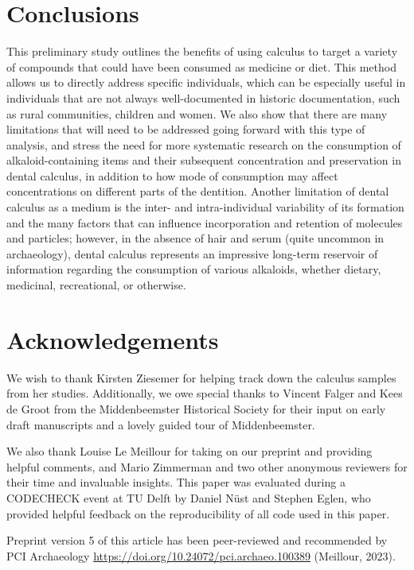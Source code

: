 \documentclass[
]{article}
\begin{document}
\section{Conclusions}\label{conclusions}

This preliminary study outlines the benefits of using calculus to target
a variety of compounds that could have been consumed as medicine or
diet. This method allows us to directly address specific individuals,
which can be especially useful in individuals that are not always
well-documented in historic documentation, such as rural communities,
children and women. We also show that there are many limitations that
will need to be addressed going forward with this type of analysis, and
stress the need for more systematic research on the consumption of
alkaloid-containing items and their subsequent concentration and
preservation in dental calculus, in addition to how mode of consumption
may affect concentrations on different parts of the dentition. Another
limitation of dental calculus as a medium is the inter- and
intra-individual variability of its formation and the many factors that
can influence incorporation and retention of molecules and particles;
however, in the absence of hair and serum (quite uncommon in
archaeology), dental calculus represents an impressive long-term
reservoir of information regarding the consumption of various alkaloids,
whether dietary, medicinal, recreational, or otherwise.

\section*{Acknowledgements}\label{acknowledgements}

We wish to thank Kirsten Ziesemer for helping track down the calculus
samples from her studies. Additionally, we owe special thanks to Vincent
Falger and Kees de Groot from the Middenbeemster Historical Society for
their input on early draft manuscripts and a lovely guided tour of
Middenbeemster.

We also thank Louise Le Meillour for taking on our preprint and
providing helpful comments, and Mario Zimmerman and two other anonymous
reviewers for their time and invaluable insights. This paper was
evaluated during a CODECHECK event at TU Delft by Daniel Nüst and
Stephen Eglen, who provided helpful feedback on the reproducibility of
all code used in this paper.

Preprint version 5 of this article has been peer-reviewed and
recommended by PCI Archaeology
\url{https://doi.org/10.24072/pci.archaeo.100389} (Meillour, 2023).
\end{document}

